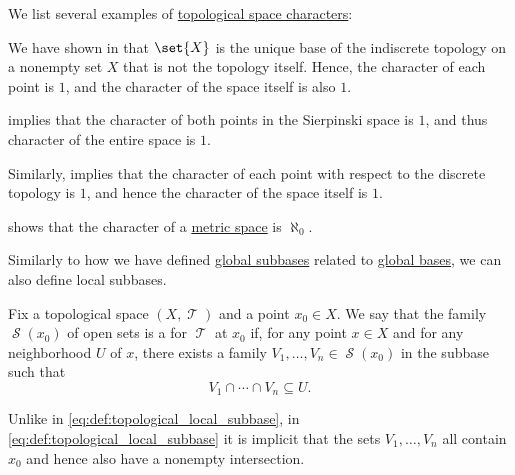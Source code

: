 \begin{example}\label{ex:def:topological_space_character}
  We list several examples of \hyperref[def:topological_space_character]{topological space characters}:
  \begin{thmenum}
     We have shown in  that \( \set{ X } \) is the unique base of the indiscrete topology on a nonempty set \( X \) that is not the topology itself. Hence, the character of each point is \( 1 \), and the character of the space itself is also \( 1 \).

      implies that the character of both points in the Sierpinski space is \( 1 \), and thus character of the entire space is \( 1 \).

     Similarly,  implies that the character of each point with respect to the discrete topology is \( 1 \), and hence the character of the space itself is \( 1 \).

      shows that the character of a \hyperref[def:metric_space]{metric space} is \( \aleph_0 \).
  \end{thmenum}
\end{example}

\begin{definition}\label{def:topological_local_subbase}\mimprovised
  Similarly to how we have defined \hyperref[def:topological_subbase]{global subbases} related to \hyperref[def:topological_base]{global bases}, we can also define local subbases.

  Fix a topological space \( (X, \mscrT) \) and a point \( x_0 \in X \). We say that the family \( \mscrS(x_0) \) of open sets is a  for \( \mscrT \) at \( x_0 \) if, for any point \( x \in X \) and for any neighborhood \( U \) of \( x \), there exists a family \( V_1, \ldots, V_n \in \mscrS(x_0) \) in the subbase such that
  \begin{equation}\label{eq:def:topological_local_subbase}
    V_1 \cap \cdots \cap V_n \subseteq U.
  \end{equation}
\end{definition}
\begin{comments}
  \item Unlike in \eqref{eq:def:topological_local_subbase}, in \eqref{eq:def:topological_local_subbase} it is implicit that the sets \( V_1, \ldots, V_n \) all contain \( x_0 \) and hence also have a nonempty intersection.
\end{comments}

